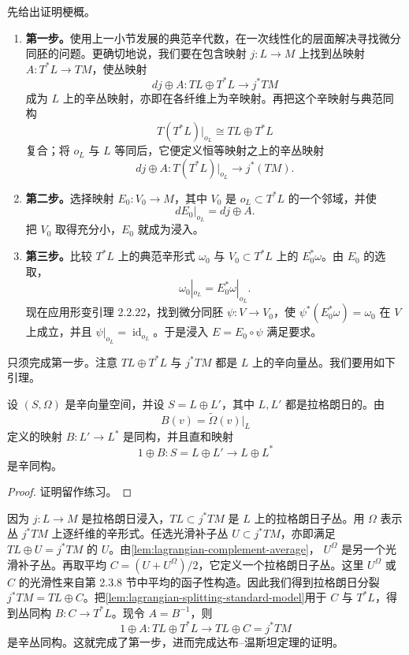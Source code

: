 先给出证明梗概。
\begin{enumerate}[label=(\arabic*)]
\item \textbf{第一步。}使用上一小节发展的典范辛代数，在一次线性化的层面解决寻找微分同胚的问题。更确切地说，我们要在包含映射 $j:L\to M$ 上找到丛映射
$A:T^*L\to TM$，使丛映射
\[
 dj\oplus A:TL\oplus T^*L\longrightarrow j^*TM
\]
成为 $L$ 上的辛丛映射，亦即在各纤维上为辛映射。再把这个辛映射与典范同构
\[
 T(T^*L)|_{o_L}\cong TL\oplus T^*L
\]
复合；将 $o_L$ 与 $L$ 等同后，它便定义恒等映射之上的辛丛映射
\[
 dj\oplus A:T(T^*L)|_{o_L}\longrightarrow j^*(TM).
\]

\item \textbf{第二步。}选择映射 $E_0:V_0\to M$，其中 $V_0$ 是
$o_L\subset T^*L$ 的一个邻域，并使
\[
 dE_0|_{o_L}=dj\oplus A.
\]
把 $V_0$ 取得充分小，$E_0$ 就成为浸入。

\item \textbf{第三步。}比较 $T^*L$ 上的典范辛形式 $\omega_0$ 与
$V_0\subset T^*L$ 上的 $E_0^*\omega$。由 $E_0$ 的选取，
\begin{equation}
 \omega_0|_{o_L}=E_0^*\omega|_{o_L}.
 \label{eq:darboux-weinstein-forms-agree}
\end{equation}
现在应用形变引理 2.2.22，找到微分同胚 $\psi:V\to V_0$，使
$\psi^*(E_0^*\omega)=\omega_0$ 在 $V$ 上成立，并且
$\psi|_{o_L}=\operatorname{id}_{o_L}$。于是浸入 $E=E_0\circ\psi$ 满足要求。
\end{enumerate}

只须完成第一步。注意 $TL\oplus T^*L$ 与 $j^*TM$ 都是 $L$ 上的辛向量丛。我们要用如下引理。

\begin{lemma}\label{lem:lagrangian-splitting-standard-model}
设 $(S,\Omega)$ 是辛向量空间，并设 $S=L\oplus L'$，其中 $L,L'$ 都是拉格朗日的。由
\[
 B(v)=\widetilde\Omega(v)|_L
\]
定义的映射 $B:L'\to L^*$ 是同构，并且直和映射
\[
 1\oplus B:S=L\oplus L'\longrightarrow L\oplus L^*
\]
是辛同构。
\end{lemma}

\begin{proof}
证明留作练习。
\end{proof}

因为 $j:L\to M$ 是拉格朗日浸入，$TL\subset j^*TM$ 是 $L$ 上的拉格朗日子丛。用 $\Omega$ 表示丛 $j^*TM$ 上逐纤维的辛形式。任选光滑补子丛 $U\subset j^*TM$，亦即满足
$TL\oplus U=j^*TM$ 的 $U$。由\cref{lem:lagrangian-complement-average}，
$U^\Omega$ 是另一个光滑补子丛。再取平均
$C=(U+U^\Omega)/2$，它定义一个拉格朗日子丛。这里 $U^\Omega$ 或 $C$ 的光滑性来自第 2.3.8 节中平均的函子性构造。因此我们得到拉格朗日分裂
$j^*TM=TL\oplus C$。把\cref{lem:lagrangian-splitting-standard-model}用于
$C$ 与 $T^*L$，得到丛同构 $B:C\to T^*L$。现令 $A=B^{-1}$，则
\[
 1\oplus A:TL\oplus T^*L\longrightarrow TL\oplus C=j^*TM
\]
是辛丛同构。这就完成了第一步，进而完成达布--温斯坦定理的证明。

